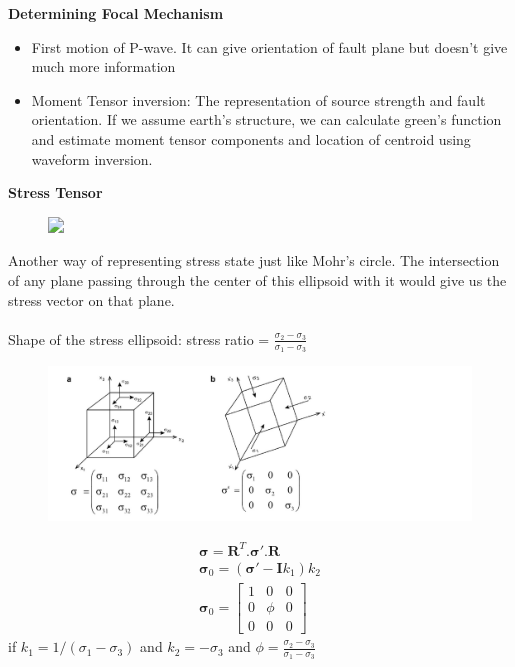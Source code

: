 \documentclass[11pt]{beamer}
\begin{document}
\begin{frame}{\textbf{Determining Focal Mechanism}}
    \begin{itemize}
        \item<1-> First motion of P-wave. It can give orientation of fault plane but doesn't give much more information
        \item<2-> Moment Tensor inversion: The representation of source strength and fault orientation. If we assume earth's structure, we can calculate green's function and estimate moment tensor components and location of centroid using waveform inversion.
    \end{itemize}
\end{frame}

\begin{frame}{\textbf{Stress Tensor}}
    \begin{figure}
        \includegraphics<1->[width=0.7\linewidth]{images/stressellipse}
    \end{figure}

    \pause%
    
    Another way of representing stress state just like Mohr's circle. The intersection of any plane passing through the center of this ellipsoid with it would give us the stress vector on that plane.
    \\~\\
    Shape of the stress ellipsoid: stress ratio = $\frac{\sigma_2 - \sigma_3}{\sigma_1 - \sigma_3}$
\end{frame}

\begin{frame}
    \begin{figure}[!htb]
        \centering
        \includegraphics[width=1\linewidth]{images/obliquestress}
    \end{figure}
    \pause%
    \begin{align*}
        \mathbf{\sigma} = \mathbf{R}^T.\mathbf{\sigma'}.\mathbf{R} \\
        \mathbf{\sigma}_0 = (\mathbf{\sigma'} - \mathbf{I}k_1)k_2 \\
        \mathbf{\sigma}_0 = 
        \begin{bmatrix}
            1 & 0 & 0 \\
            0 & \phi & 0 \\
            0 & 0 & 0
        \end{bmatrix}
    \end{align*}
    if $k_1 = 1/(\sigma_1 - \sigma_3)$ and $k_2 = -\sigma_3$ and $\phi = \frac{\sigma_2 - \sigma_3}{\sigma_1 - \sigma_3}$

\end{frame}
\end{document}
